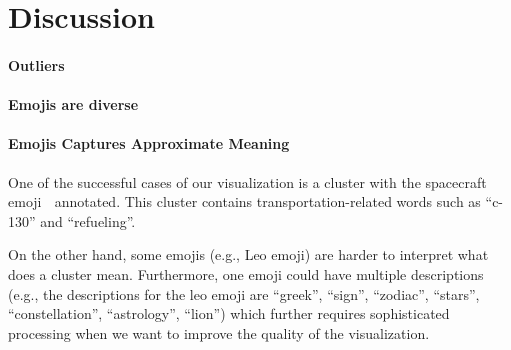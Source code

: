 \section{Discussion}

\paragraph{Outliers} 

\paragraph{Emojis are diverse} 

\paragraph{Emojis Captures Approximate Meaning} 
One of the successful cases of our visualization is a cluster with the spacecraft emoji 🚀 annotated. This cluster contains transportation-related words such as ``c-130'' and ``refueling''. 

On the other hand, some emojis (e.g., Leo emoji) are harder to interpret what does a cluster mean. 
Furthermore, one emoji could have multiple descriptions (e.g., the descriptions for the leo emoji are ``greek'', ``sign'', ``zodiac'', ``stars'', ``constellation'', ``astrology'', ``lion'') which further requires sophisticated processing when we want to improve the quality of the visualization. 

